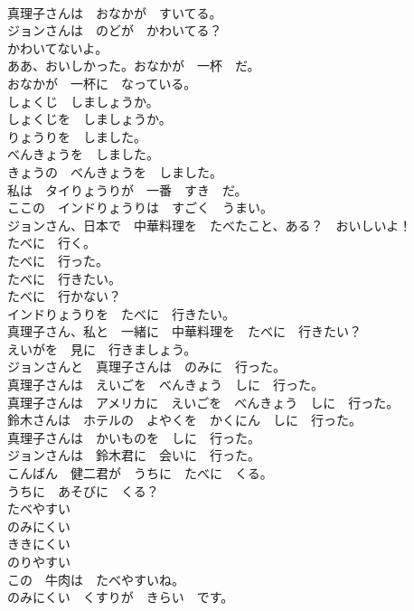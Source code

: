 \documentclass[8pt]{extreport}
\begin{document}
\begin{CJK}{UTF8}{min}
\\	真理子さんは　おなかが　すいてる。	
\\	ジョンさんは　のどが　かわいてる？	
\\	かわいてないよ。	
\\	ああ、おいしかった。おなかが　一杯　だ。	
\\	おなかが　一杯に　なっている。	
\\	しょくじ　しましょうか。	
\\	しょくじを　しましょうか。	
\\	りょうりを　しました。	
\\	べんきょうを　しました。	
\\	きょうの　べんきょうを　しました。	
\\	私は　タイりょうりが　一番　すき　だ。	
\\	ここの　インドりょうりは　すごく　うまい。	
\\	ジョンさん、日本で　中華料理を　たべたこと、ある？　おいしいよ！	
\\	たべに　行く。	
\\	たべに　行った。	
\\	たべに　行きたい。	
\\	たべに　行かない？	
\\	インドりょうりを　たべに　行きたい。	
\\	真理子さん、私と　一緒に　中華料理を　たべに　行きたい？	
\\	えいがを　見に　行きましょう。	
\\	ジョンさんと　真理子さんは　のみに　行った。	
\\	真理子さんは　えいごを　べんきょう　しに　行った。	
\\	真理子さんは　アメリカに　えいごを　べんきょう　しに　行った。	
\\	鈴木さんは　ホテルの　よやくを　かくにん　しに　行った。	
\\	真理子さんは　かいものを　しに　行った。	
\\	ジョンさんは　鈴木君に　会いに　行った。	
\\	こんばん　健二君が　うちに　たべに　くる。	
\\	うちに　あそびに　くる？	
\\	たべやすい	
\\	のみにくい	
\\	ききにくい	
\\	のりやすい	
\\	この　牛肉は　たべやすいね。	
\\	のみにくい　くすりが　きらい　です。	

\end{CJK}
\end{document}
